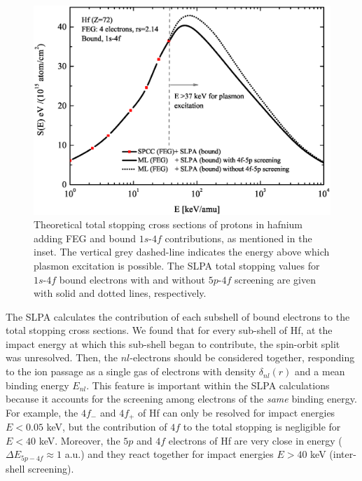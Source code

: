 \documentclass[aps,prb,reprint,groupedaddress]{revtex4-1}
\begin{document}
\begin{figure}[!t]
\centering
\includegraphics[width=13.cm]{Fig02.eps}
\caption{Theoretical total stopping cross sections of protons in hafnium adding FEG and bound $1s$-$4f$ contributions, as mentioned in the inset. The vertical grey dashed-line indicates the energy above which plasmon excitation is possible. %
The SLPA total stopping values for $1s$-$4f$ bound electrons with and without $5p$-$4f$ screening are given with solid and dotted lines, respectively.}
\label{slpa4f}
\end{figure}

The SLPA calculates the contribution of each subshell of bound electrons to the total stopping cross sections. We found that for every sub-shell of Hf, at the impact energy at which this sub-shell began to contribute, the spin-orbit split was unresolved.  
Then, the $nl$-electrons should be considered together, responding to the ion passage as a single gas of electrons with density $\delta_{nl}(r)$ and a mean binding energy $E_{nl}$. 
This feature is important within the SLPA calculations because it accounts for the screening among electrons of the \textit{same} binding energy. For example, the $4f_{-}$ and $4f_{+}$ of Hf can only be resolved for impact energies $E<0.05$ keV, but the contribution of $4f$ to the total stopping is negligible for $E<40$ keV. Moreover, the $5p$ and $4f$ electrons of Hf are very close in energy ( $\Delta E_{5p-4f} \approx 1 $ a.u.\cite{mendez2019}) 
and they react together for impact energies $E>40$ keV (inter-shell screening).
\end{document}
